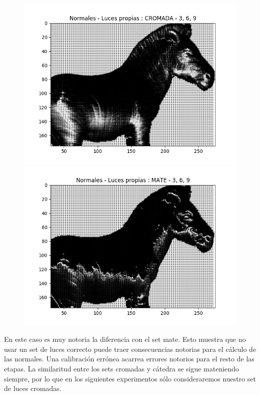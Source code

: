\begin{figure}[H]
\centering
\begin{minipage}{.5\textwidth}
  \centering
  \includegraphics[width=1\linewidth]{informe/imagenes/normales/normalesLucesPropias369.png}
\end{minipage}%
\begin{minipage}{.5\textwidth}
  \centering
  \includegraphics[width=1\linewidth]{informe/imagenes/normales/normalesLucesPropiasMate369.png}
\end{minipage}
\end{figure}

En este caso es muy notoria la diferencia con el set mate. Esto muestra que no usar un set de luces correcto puede traer consecuencias notorias para el cálculo de las normales. Una calibración errónea acarrea errores notorios para el resto de las etapas. La similaritud entre los sets cromadas y cátedra se sigue mateniendo siempre, por lo que en los siguientes experimentos sólo consideraremos nuestro set de luces cromadas. \\

